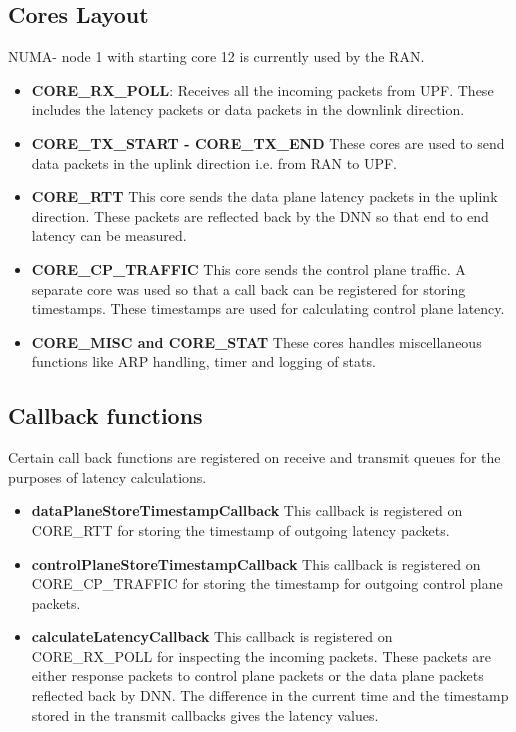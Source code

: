 \documentclass{article}
\begin{document}
\subsection{Cores Layout}
NUMA- node 1 with starting core 12 is currently used by the RAN.
\begin{itemize}
    \item \textbf{CORE\_RX\_POLL}: Receives all the incoming packets from UPF. These includes the latency packets or data packets in the downlink direction.
    \item \textbf{CORE\_TX\_START - CORE\_TX\_END}
    These cores are used to send data packets in the uplink  direction i.e. from RAN to UPF.
    \item \textbf{CORE\_RTT}
    This core sends the data plane latency packets in the uplink direction. These packets are reflected back by the DNN so that end to end latency can be measured.
    \item \textbf{CORE\_CP\_TRAFFIC} This core sends the control plane traffic. A separate core was used so that a call back can be registered for storing timestamps. These timestamps are used for calculating control plane latency.
    \item \textbf{CORE\_MISC and CORE\_STAT}
    These cores handles miscellaneous functions like ARP handling, timer and logging of stats.
\end{itemize}
\subsection{Callback functions}
Certain call back functions are registered on receive and transmit queues for the purposes of latency calculations.
\begin{itemize}
    \item \textbf{dataPlaneStoreTimestampCallback} 
    This callback is registered on CORE\_RTT for storing the timestamp of outgoing latency packets.
    \item \textbf{controlPlaneStoreTimestampCallback} This callback is registered on CORE\_CP\_TRAFFIC for storing the timestamp for outgoing control plane packets.
    \item \textbf{calculateLatencyCallback} This callback is registered on CORE\_RX\_POLL for inspecting the incoming packets. 
    These packets are either response packets to control plane packets or the data plane packets reflected back by DNN. The difference in the current time and the timestamp stored in the transmit callbacks gives the latency values.  
\end{itemize}
\end{document}
